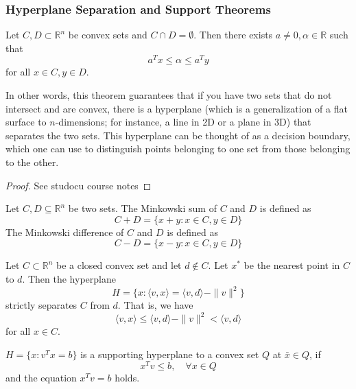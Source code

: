 \subsubsection{Hyperplane Separation and Support Theorems}
\begin{theorem}
    Let $C, D \subset \mathbb R^n$ be convex sets and $C \cap D = \emptyset$. Then there exists $a \neq 0, \alpha \in \mathbb R$ such that $$a^Tx \leq \alpha \leq a^Ty$$ for all $x \in C, y \in D$.

    \bigskip
    In other words, this theorem guarantees that if you have two sets that do not intersect and are convex, there is a hyperplane (which is a generalization of a flat surface to $n$-dimensions; for instance, a line in 2D or a plane in 3D) that separates the two sets. This hyperplane can be thought of as a decision boundary, which one can use to distinguish points belonging to one set from those belonging to the other.
\end{theorem}
\begin{proof}[Proof]
    See studocu course notes
\end{proof}
\begin{definition}
    Let $C, D \subseteq \mathbb R^n$ be two sets. The Minkowski sum of $C$ and $D$ is defined as
    $$C + D = \{x + y: x \in C, y \in D\}$$
    The Minkowski difference of $C$ and $D$ is defined as
    $$C - D = \{x - y: x \in C, y \in D\}$$
\end{definition}
\begin{lemma}
    Let $C \subset \mathbb R^n$ be a closed convex set and let $d \not \in C$. Let $x^*$ be the nearest point in $C$ to $d$. Then the hyperplane $$H = \{x: \langle v, x \rangle = \langle v, d \rangle - \|v\|^2\}$$ strictly separates $C$ from $d$. That is, we have
    $$\langle v, x \rangle \leq \langle v, d \rangle - \|v\|^2 < \langle v, d \rangle$$ for all $x \in C$.
\end{lemma}
\begin{definition}
    $H = \{x: v^Tx = b\}$ is a supporting hyperplane to a convex set $Q$ at $\bar x \in Q$, if 
    $$x^Tv \leq b , \quad \forall x \in Q$$ and the equation $x^T v = b$ holds.
\end{definition}



